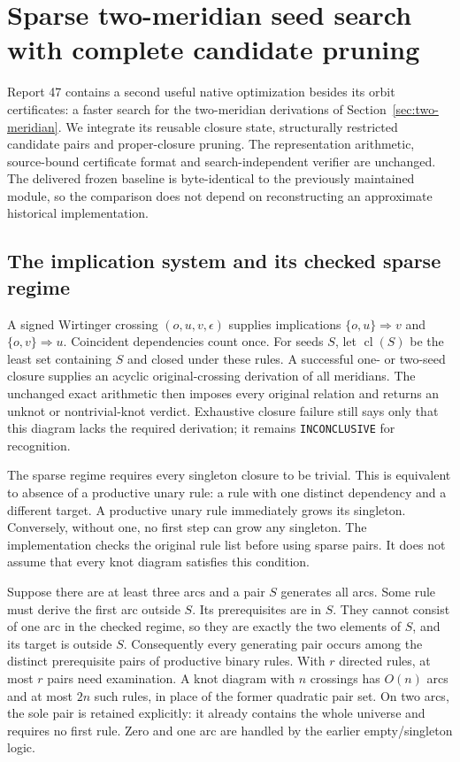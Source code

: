 \section{Sparse two-meridian seed search with complete candidate pruning}
\label{sec:sparse-seeds}

Report 47 contains a second useful native optimization besides its orbit
certificates: a faster search for the two-meridian derivations of
Section~\ref{sec:two-meridian}. We integrate its reusable closure state,
structurally restricted candidate pairs and proper-closure pruning.
The representation arithmetic, source-bound certificate format and
search-independent verifier are unchanged. The delivered frozen baseline is
byte-identical to the previously maintained module, so the comparison does
not depend on reconstructing an approximate historical implementation.

\subsection{The implication system and its checked sparse regime}

A signed Wirtinger crossing $(o,u,v,\epsilon)$ supplies implications
$\{o,u\}\Rightarrow v$ and $\{o,v\}\Rightarrow u$. Coincident dependencies
count once. For seeds $S$, let $\operatorname{cl}(S)$ be the least set
containing $S$ and closed under these rules. A successful one- or two-seed
closure supplies an acyclic original-crossing derivation of all meridians.
The unchanged exact arithmetic then imposes every original relation and
returns an unknot or nontrivial-knot verdict. Exhaustive closure failure
still says only that this diagram lacks the required derivation; it remains
\texttt{INCONCLUSIVE} for recognition.

The sparse regime requires every singleton closure to be trivial. This is
equivalent to absence of a productive unary rule: a rule with one distinct
dependency and a different target. A productive unary rule immediately grows
its singleton. Conversely, without one, no first step can grow any singleton.
The implementation checks the original rule list before using sparse pairs.
It does not assume that every knot diagram satisfies this condition.

Suppose there are at least three arcs and a pair $S$ generates all arcs.
Some rule must derive the first arc outside $S$. Its prerequisites are in
$S$. They cannot consist of one arc in the checked regime, so they are
exactly the two elements of $S$, and its target is outside $S$.
Consequently every generating pair occurs among the distinct prerequisite
pairs of productive binary rules. With $r$ directed rules, at most $r$
pairs need examination. A knot diagram with $n$ crossings has $O(n)$ arcs
and at most $2n$ such rules, in place of the former quadratic pair set.
On two arcs, the sole pair is retained explicitly: it already contains the
whole universe and requires no first rule. Zero and one arc are handled
by the earlier empty/singleton logic.

